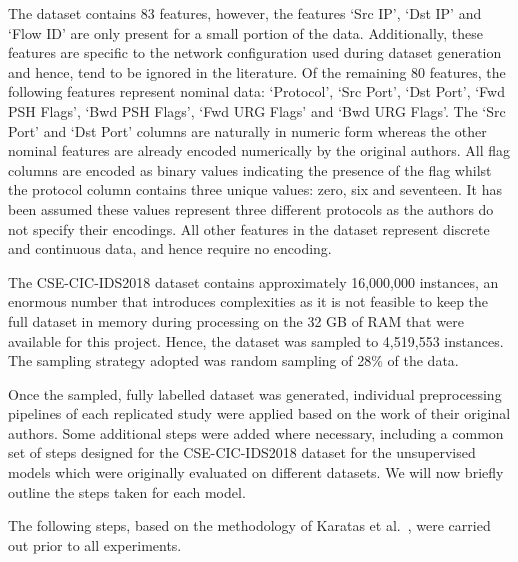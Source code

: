 The dataset contains 83 features, however, the features `Src IP', `Dst IP' and
`Flow ID' are only present for a small portion of the data. Additionally, these
features are specific to the network configuration used during dataset
generation and hence, tend to be ignored in the literature. Of the remaining 80
features, the following features represent nominal data: `Protocol', `Src
Port', `Dst Port', `Fwd PSH Flags', `Bwd PSH Flags', `Fwd URG Flags' and `Bwd
URG Flags'. The `Src Port' and `Dst Port' columns are naturally in numeric form
whereas the other nominal features are already encoded numerically by the
original authors. All flag columns are encoded as binary values indicating the
presence of the flag whilst the protocol column contains three unique values:
zero, six and seventeen. It has been assumed these values represent three
different protocols as the authors do not specify their encodings. All other
features in the dataset represent discrete and continuous data, and hence
require no encoding.

The CSE-CIC-IDS2018 dataset contains approximately 16,000,000 instances, an
enormous number that introduces complexities as it is not feasible to keep the
full dataset in memory during processing on the 32 GB of RAM that were
available for this project. Hence, the dataset was sampled to 4,519,553
instances. The sampling strategy adopted was random sampling of 28\% of the
data.

Once the sampled, fully labelled dataset was generated, individual
preprocessing pipelines of each replicated study were applied based on the work
of their original authors. Some additional steps were added where necessary,
including a common set of steps designed for the CSE-CIC-IDS2018 dataset for
the unsupervised models which were originally evaluated on different datasets.
We will now briefly outline the steps taken for each model.

The following steps, based on the methodology of Karatas et al.~\cite{Karatas},
were carried out prior to all experiments.


